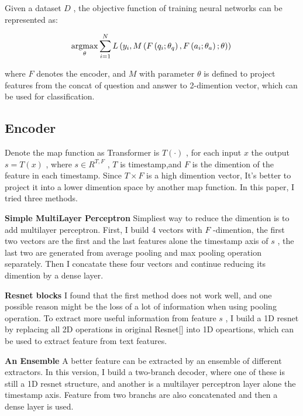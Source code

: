 \documentclass{article}%
\begin{document}
%
Given a dataset  $D$ , the objective function of training neural networks can be represented as:%

%
\[%
\underset{\theta}{\operatorname{argmax}}  \sum_{i=1}^N L\left(y_i,M\left(F\left(q_i;\theta_q\right),F\left(a_i;\theta_a\right);\theta\right)\right)\\%
\]%
%

%
where  $F$  denotes the encoder, and  $M$  with parameter  $\theta$  is defined to project features from the concat of question and answer to 2{-}dimention vector, which can be used for classification.%

%

%
\subsection{Encoder}%

%
Denote the map function as Transformer is  $T(\cdot)$ , for each input  $x$  the output  $s=T(x)$ , where  $s\in R^{T,F}$ ,  $T$  is timestamp,and  $F$  is the dimention of the feature in each timestamp. Since  $T \times F$  is a high dimention vector, It's better to project it into a lower dimention space by another map function. In this paper, I tried three methods.%

%

%
\textbf{Simple MultiLayer Perceptron} Simpliest way to reduce the dimention is to add multilayer perceptron. First, I build 4 vectors with  $F$ {-}dimention, the first two vectors are the first and the last features alone the timestamp axis of  $s$ , the last two are generated from average pooling and max pooling operation separately. Then I concatate these four vectors and continue reducing its dimention by a dense layer.%

%
\textbf{Resnet blocks} I found that the first method does not work well, and one possible reason might be the loss of a lot of information when using pooling operation. To extract more useful information from feature  $s$ , I build a 1D resnet by replacing all 2D operations in original Resnet{[}{]} into 1D opeartions, which can be used to extract feature from text features.%

%

%
\textbf{An Ensemble} A better feature can be extracted by an ensemble of different extractors. In this version, I build a two{-}branch decoder, where one of these is still a 1D resnet structure, and another is a multilayer perceptron layer alone the timestamp axis. Feature from two branchs are also concatenated and then a dense layer is used.%
\end{document}
